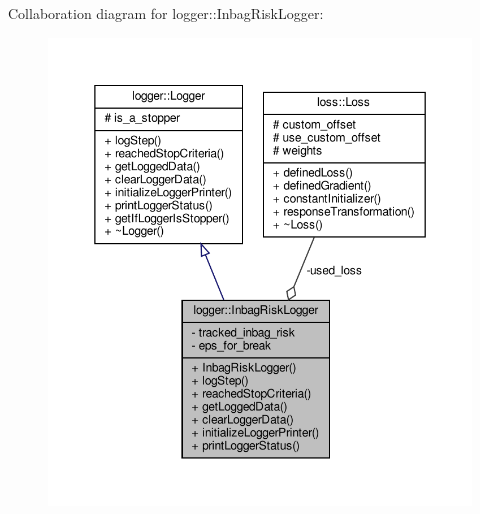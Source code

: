 Collaboration diagram for logger\+:\+:Inbag\+Risk\+Logger\+:\nopagebreak
\begin{figure}[H]
\begin{center}
\leavevmode
\includegraphics[width=350pt]{classlogger_1_1_inbag_risk_logger__coll__graph}
\end{center}
\end{figure}
